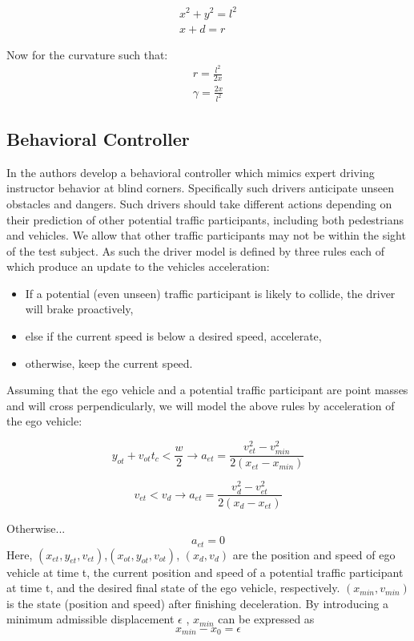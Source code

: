 \documentclass{easychair}
\begin{document}
\begin{align}
	x^2+y^2=l^2\\
	x+d=r
\end{align}

\noindent Now for the curvature such that:
\begin{align}
	r=\frac{l^2}{2x}\\
	\gamma=\frac{2x}{l^2}
\end{align}


\subsection{Behavioral Controller}
In \cite{Ninomiya} the authors develop a behavioral controller which mimics expert driving instructor behavior at blind corners. Specifically such drivers anticipate unseen obstacles and dangers. Such drivers should take different actions depending on their prediction of other potential traffic participants, including both pedestrians and vehicles. We allow that other traffic participants may not be within the sight of the test subject. As such the driver model is defined by three rules each of which produce an update to the vehicles acceleration: 
\begin{itemize}
	\item If a potential (even unseen) traffic participant is likely to collide, the driver will brake proactively, 
	\item else if the current speed is below a desired speed, accelerate, 
	\item otherwise, keep the current speed. 
\end{itemize}

Assuming that the ego vehicle and a potential traffic participant are point masses and will cross perpendicularly, we will model the above rules by acceleration of the ego vehicle:

\begin{equation}
y_{ot}+v_{ot}t_c < \frac{w}{2} \to a_{et} = \frac{v_{et}^2 - v_{min}^2}{2(x_{et}-x_{min})} 
\end{equation} 

\begin{equation}
v_{et}<v_d \to a_{et}=	\frac{v_{d}^2 -v_{et}^2}{2(x_d - x_{et})}
\end{equation}

\noindent Otherwise...
\begin{equation}
  a_{et}=0
\end{equation}
Here, $(x_{et}, y_{et}, v_{et})$,$(x_{ot}, y_{ot}, v_{ot})$, $(x_d,v_d)$ are the position and speed of ego vehicle at time t, the current position and speed of a potential traffic participant at time t, and the desired final state of the ego vehicle, respectively. $(x_{min},v_{min})$  is the state (position and speed) after finishing deceleration. By introducing a minimum admissible displacement $\epsilon$ , $x_{min}$  can be expressed as
\begin{equation}
	x_{min} - x_0=\epsilon
\end{equation}
\end{document}
